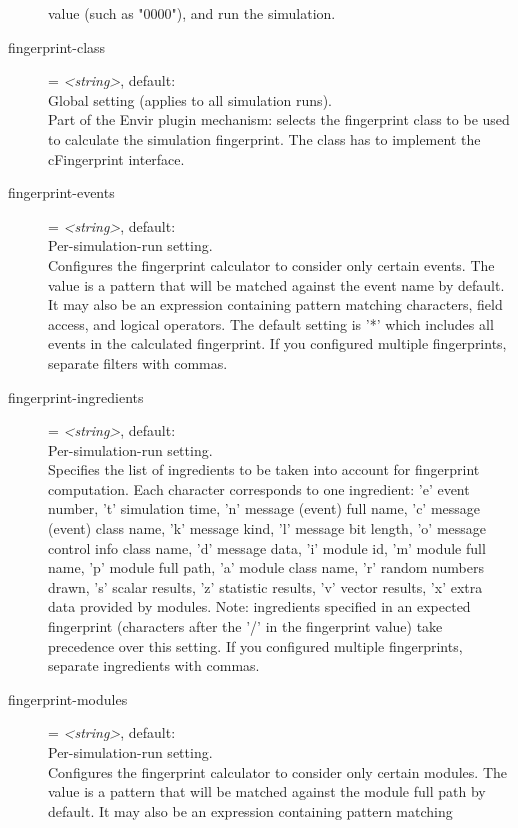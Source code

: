\begin{description}
    value (such as "0000"), and run the simulation.
\item[fingerprint-class] = \textit{<string>}, default: \\
    Global setting (applies to all simulation runs).\\
    Part of the Envir plugin mechanism: selects the fingerprint class to be
    used to calculate the simulation fingerprint. The class has to implement
    the cFingerprint interface.
\item[fingerprint-events] = \textit{<string>}, default: \ttt{*}\\
    Per-simulation-run setting.\\
    Configures the fingerprint calculator to consider only certain events. The
    value is a pattern that will be matched against the event name by default.
    It may also be an expression containing pattern matching characters, field
    access, and logical operators. The default setting is '*' which includes
    all events in the calculated fingerprint. If you configured multiple
    fingerprints, separate filters with commas.
\item[fingerprint-ingredients] = \textit{<string>}, default: \\
    Per-simulation-run setting.\\
    Specifies the list of ingredients to be taken into account for fingerprint
    computation. Each character corresponds to one ingredient: 'e' event
    number, 't' simulation time, 'n' message (event) full name, 'c' message
    (event) class name, 'k' message kind, 'l' message bit length, 'o' message
    control info class name, 'd' message data, 'i' module id, 'm' module full
    name, 'p' module full path, 'a' module class name, 'r' random numbers
    drawn, 's' scalar results, 'z' statistic results, 'v' vector results, 'x'
    extra data provided by modules. Note: ingredients specified in an expected
    fingerprint (characters after the '/' in the fingerprint value) take
    precedence over this setting. If you configured multiple fingerprints,
    separate ingredients with commas.
\item[fingerprint-modules] = \textit{<string>}, default: \ttt{*}\\
    Per-simulation-run setting.\\
    Configures the fingerprint calculator to consider only certain modules. The
    value is a pattern that will be matched against the module full path by
    default. It may also be an expression containing pattern matching

\end{description}
